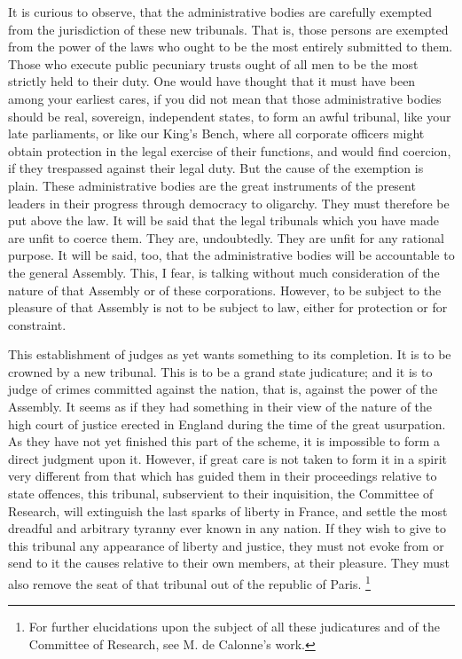 It is curious to observe, that the administrative bodies are carefully exempted from the jurisdiction of these new tribunals. That is, those persons are exempted from the power of the laws who ought to be the most entirely submitted to them. Those who execute public pecuniary trusts ought of all men to be the most strictly held to their duty. One would have thought that it must have been among your earliest cares, if you did not mean that those administrative bodies should be real, sovereign, independent states, to form an awful tribunal, like your late parliaments, or like our King's Bench, where all corporate officers might obtain protection in the legal exercise of their functions, and would find coercion, if they trespassed against their legal duty. But the cause of the exemption is plain. These administrative bodies are the great instruments of the present leaders in their progress through democracy to oligarchy. They must therefore be put above the law. It will be said that the legal tribunals which you have made are unfit to coerce them. They are, undoubtedly. They are unfit for any rational purpose. It will be said, too, that the administrative bodies will be accountable to the general Assembly. This, I fear, is talking without much consideration of the nature of that Assembly or of these corporations. However, to be subject to the pleasure of that Assembly is not to be subject to law, either for protection or for constraint.

This establishment of judges as yet wants something to its completion. It is to be crowned by a new tribunal. This is to be a grand state judicature; and it is to judge of crimes committed against the nation, that is, against the power of the Assembly. It seems as if they had something in their view of the nature of the high court of justice erected in England during the time of the great usurpation. As they have not yet finished this part of the scheme, it is impossible to form a direct judgment upon it. However, if great care is not taken to form it in a spirit very different from that which has guided them in their proceedings relative to state offences, this tribunal, subservient to their inquisition, the Committee of Research, will extinguish the last sparks of liberty in France, and settle the most dreadful and arbitrary tyranny ever known in any nation. If they wish to give to this tribunal any appearance of liberty and justice, they must not evoke from or send to it the causes relative to their own members, at their pleasure. They must also remove the seat of that tribunal out of the republic of Paris.
\footnote{ For further elucidations upon the subject of all these judicatures and of the Committee of Research, see M. de Calonne's work.}


